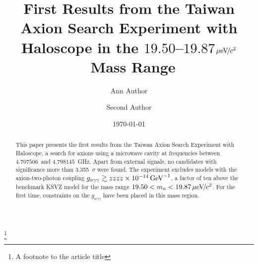 \documentclass[%
preprint, %
 amsmath,amssymb,
 aps,
]{revtex4-2}
\newcommand{\gagg}{\ensuremath{g_{a\gamma\gamma}}}
\newcommand{\ma}{\ensuremath{m_a}}
\newcommand{\muevcc}{\ensuremath{\,\mu\text{e\hspace{-.08em}V\hspace{-0.16em}/\hspace{-0.08em}}c^2}}
\newcommand{\GeVinv}{\ensuremath{\,\text{Ge\hspace{-.08em}V}^{-1}}}
\newcommand{\flo}{\ensuremath{4.707506}}
\newcommand{\fhi}{\ensuremath{4.798145}}
\newcommand{\mlo}{\ensuremath{19.50}}
\newcommand{\mhi}{\ensuremath{19.87}}
\newcommand{\avelimit}{\ensuremath{zzzz\times 10^{-14}}}
\begin{document}

\title{First Results from the Taiwan Axion Search Experiment with Haloscope in the \mlo--\mhi\muevcc\ Mass Range}%
\thanks{A footnote to the article title}%

\author{Ann Author}
\author{Second Author}%
%



\date{\today}%

\begin{abstract}

 This paper presents the first results from the 
Taiwan Axion Search Experiment with Haloscope, a search for axions 
using a microwave cavity at frequencies between \flo\ and \fhi~GHz. 
Apart from external signals, no candidates with significance more than 
3.355~$\sigma$ were found. The experiment excludes models with the axion-two-photon 
coupling $\gagg\gtrsim \avelimit\GeVinv$, a factor of ten above the benchmark 
KSVZ model for the mass range $\mlo < \ma < \mhi \muevcc$. For the first time, 
constraints on the $\gagg$ have been placed in this mass region. 


\end{abstract}

\maketitle
\end{document}
